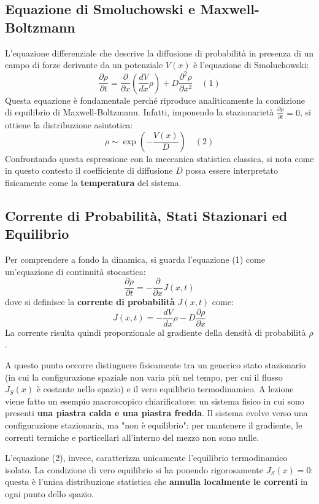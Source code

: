 \documentclass[12pt,a4paper]{article}
\begin{document}
\subsection{Equazione di Smoluchowski e Maxwell-Boltzmann}
L'equazione differenziale che descrive la diffusione di probabilità in presenza di un campo di forze derivante da un potenziale $V(x)$ è l'equazione di Smoluchowski:
\begin{equation}
\frac{\partial \rho}{\partial t} = \frac{\partial}{\partial x} \left( \frac{dV}{dx} \rho \right) + D \frac{\partial^2 \rho}{\partial x^2} \quad (1)
\end{equation}
Questa equazione è fondamentale perché riproduce analiticamente la condizione di equilibrio di Maxwell-Boltzmann. Infatti, imponendo la stazionarietà $\frac{\partial \rho}{\partial t} = 0$, si ottiene la distribuzione asintotica:
\begin{equation}
\rho \sim \exp\left( - \frac{V(x)}{D} \right) \quad (2)
\end{equation}
Confrontando questa espressione con la meccanica statistica classica, si nota come in questo contesto il coefficiente di diffusione $D$ possa essere interpretato fisicamente come la \textbf{temperatura} del sistema.

\subsection{Corrente di Probabilità, Stati Stazionari ed Equilibrio}
Per comprendere a fondo la dinamica, si guarda l'equazione (1) come un'equazione di continuità stocastica:
\begin{equation}
\frac{\partial \rho}{\partial t} = -\frac{\partial}{\partial x} J(x,t)
\end{equation}
dove si definisce la \textbf{corrente di probabilità} $J(x,t)$ come:
\begin{equation}
J(x,t) = - \frac{dV}{dx} \rho - D \frac{\partial \rho}{\partial x}
\end{equation}
La corrente risulta quindi proporzionale al gradiente della densità di probabilità $\rho$.

A questo punto occorre distinguere fisicamente tra un generico stato stazionario (in cui la configurazione spaziale non varia più nel tempo, per cui il flusso $J_S(x)$ è costante nello spazio) e il vero equilibrio termodinamico. 
A lezione viene fatto un esempio macroscopico chiarificatore: un sistema fisico in cui sono presenti \textbf{una piastra calda e una piastra fredda}. Il sistema evolve verso una configurazione stazionaria, ma "non è equilibrio": per mantenere il gradiente, le correnti termiche e particellari all'interno del mezzo non sono nulle. 

L'equazione (2), invece, caratterizza unicamente l'equilibrio termodinamico isolato. La condizione di vero equilibrio si ha ponendo rigorosamente $J_S(x) = 0$: questa è l'unica distribuzione statistica che \textbf{annulla localmente le correnti} in ogni punto dello spazio.

\end{document}
